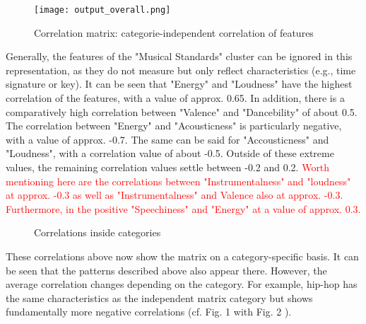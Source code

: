 \begin{figure}[H]
    \centering
    \caption[]{Correlation matrix: categorie-independent correlation of features}
	\label{fig:du_cm_overall}
    \texttt{[image: output\_overall.png]}
\end{figure}

Generally, the features of the "Musical Standards" cluster can be ignored in this representation,
as they do not measure but only reflect characteristics (e.g., time signature or key).
It can be seen that "Energy" and "Loudness" have the highest correlation of the features,
with a value of approx. 0.65.  
In addition, there is a comparatively high correlation between "Valence" and "Dancebility" of
about 0.5. 
The correlation between "Energy" and "Acousticness" is particularly negative, with a value of approx. -0.7.
The same can be said for "Accousticness" and "Loudness", with a correlation value of about -0.5.
Outside of these extreme values, the remaining correlation values settle between -0.2 and 0.2.
\textcolor{red}{Worth mentioning here are the correlations between "Instrumentalness" and "loudness" at
approx. -0.3 as well as "Instrumentalness" and Valence also at approx. -0.3. Furthermore,
in the positive "Speechiness" and "Energy" at a value of approx. 0.3.}

\begin{figure}[H]
    \centering
    \qquad
    \qquad
    \caption{Correlations inside categories}%
    \label{fig:du_cm_categorie_dependent}%
\end{figure}

These correlations above now show the matrix on a category-specific basis.
It can be seen that the patterns described above also appear there.
However, the average correlation changes depending on the category.
For example, hip-hop has the same characteristics as the independent matrix category but shows
fundamentally more negative correlations (cf. Fig. 1 with Fig. 2 ).

